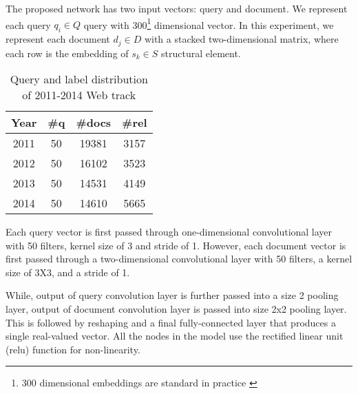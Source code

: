 The proposed network has two input vectors: query and document. We represent each 
query $q_i \in \mathit{Q}$ query with 300\footnote{300 dimensional 
embeddings are standard in practice 
\cite{mitra2015query,zamani2016estimating}} dimensional vector. 
In this experiment, we represent each document $d_j \in \mathit{D}$  
with a stacked two-dimensional matrix, where each row is the embedding 
of $s_k \in \mathit{S}$ structural element. 
\begin{table}
  \centering
 \caption{Query and label distribution of 2011-2014 Web track}
 \label{table:data_distribution} 
 \begin{tabular}{|c|c|c|c|}
\hline
Year	&	\#q	&	\#docs	&	\#rel	 \\ \hline
2011	&	50	&	19381	&	3157		\\ \hline
2012	&	50	&	16102	&	3523		\\ \hline
2013	&	50	&	14531	&	4149		\\ \hline
2014	&	50	&	14610	&	5665		\\ \hline
 \end{tabular}
\end{table}

Each query vector is first passed through one-dimensional convolutional
layer with 50 filters, kernel size of 3 and stride of 1. 
However, each document vector is first passed through a two-dimensional convolutional
layer with 50 filters, a kernel size of 3X3, and a stride of 1. 

While, output of query convolution layer is further passed into a size 2 pooling 
layer, output of document convolution layer is passed into size 2x2 pooling layer.  
This is followed by reshaping and a final fully-connected layer 
that produces a single real-valued vector. 
All the nodes in the model use the rectified linear unit (relu) function 
for non-linearity.

